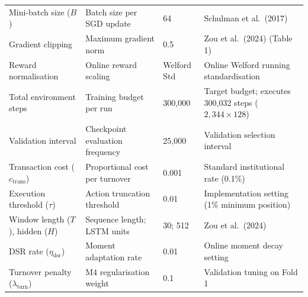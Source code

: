 \begin{table}[H]
\begin{tabular}{@{}p{3.4cm}p{4.2cm}p{1.6cm}p{6.3cm}@{}}
Mini-batch size ($B$) & Batch size per SGD update & 64 & Schulman et al.\ (2017) \citep{schulman2017proximal} \\
Gradient clipping & Maximum gradient norm & 0.5 & Zou et al.\ (2024) \citep{zou2024novel} (Table 1) \\
Reward normalisation & Online reward scaling & Welford Std & Online Welford running standardisation \\
Total environment steps & Training budget per run & 300,000 & Target budget; executes 300,032 steps ($2{,}344 \times 128$) \\
Validation interval & Checkpoint evaluation frequency & 25,000 & Validation selection interval \\
Transaction cost ($c_{\text{trans}}$) & Proportional cost per turnover & 0.001 & Standard institutional rate \citep{zou2024novel} (0.1\%) \\
Execution threshold ($\tau$) & Action truncation threshold & 0.01 & Implementation setting (1\% minimum position) \\
Window length ($T$), hidden ($H$) & Sequence length; LSTM units & 30; 512 & Zou et al.\ (2024) \citep{zou2024novel} \\
DSR rate ($\eta_{\text{dsr}}$) & Moment adaptation rate & 0.01 & Online moment decay setting \citep{millea2021deep} \\
Turnover penalty ($\lambda_{\text{turn}}$) & M4 regularisation weight & 0.1 & Validation tuning on Fold 1 \citep{wang2025risk} \\
\bottomrule
\end{tabular}
\end{table}
